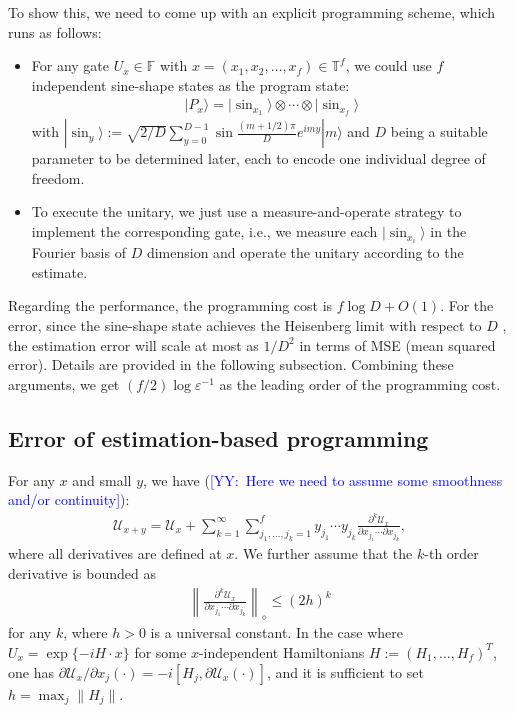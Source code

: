 \documentclass[11pt,letterpaper]{article}
\newcommand{\ket}[1]{| #1 \rangle}
\def\eps{\varepsilon}
\newcommand{\YY}[1]{\textcolor{blue}{[YY:\ #1]}}
\begin{document}
To show this, we need to come up with an explicit programming scheme, which runs as follows:
\begin{itemize}
    \item For any gate $U_x\in\mathbb{F}$ with $x=(x_1,x_2,\dots,x_f)\in\mathbb{T}^f$, we could use $f$ independent sine-shape states \cite{buvzek1999optimal} as the program state:
    \begin{align*}
        \ket{P_x}=\ket{\sin_{x_1}}\otimes\cdots\otimes\ket{\sin_{x_f}}
    \end{align*}
    with $\ket{\sin_{y}}:=\sqrt{2/D}\sum_{y=0}^{D-1} \sin\frac{(m+1/2)\pi}{D}e^{imy}\ket{m}$ and $D$ being a suitable parameter to be determined later, each to encode one individual degree of freedom. 
    \item To execute the unitary, we just use a measure-and-operate strategy to implement the corresponding gate, i.e., we measure each $\ket{\sin_{x_i}}$ in the Fourier basis of $D$ dimension and operate the unitary according to the estimate.  
\end{itemize}
Regarding the performance, the programming cost is $f\log D+O(1)$. For the error, since the sine-shape state achieves the Heisenberg limit with respect to $D$ \cite{buvzek1999optimal}, the estimation error will scale at most as $1/D^2$ in terms of MSE (mean squared error). Details are provided in the following subsection. Combining these arguments, we get $(f/2)\log\eps^{-1}$ as the leading order of the programming cost.

\subsection{Error of estimation-based programming}
For any $x$ and small $y$, we have (\YY{Here we need to assume some smoothness and/or continuity}):
\begin{align}\label{eq:taylorUx}
    \mathcal{U}_{x+y} = \mathcal{U}_{x} + \sum_{k=1}^{\infty}\sum_{j_1,\dots,j_k=1}^{f}y_{j_1}\cdots y_{j_k}\frac{\partial^k \mathcal{U}_x}{\partial x_{j_1}\cdots\partial x_{j_k}},
\end{align}
where all derivatives are defined at $x$. We further assume that the $k$-th order derivative is bounded as
\begin{align}\label{eq:derivativebound}
    \left\|\frac{\partial^k \mathcal{U}_x}{\partial x_{j_1}\cdots\partial x_{j_k}}\right\|_{\diamond}\le (2h)^k
\end{align}
for any $k$, where $h>0$ is a universal constant. In the case where $U_x=\exp\{-iH\cdot x\}$ for some $x$-independent Hamiltonians $H:=(H_1,\dots,H_f)^T$, one has $\partial \mathcal{U}_x/\partial{x_j}(\cdot)=-i[H_j,\partial \mathcal{U}_x(\cdot)]$, and it is sufficient to set $h=\max_j\|H_j\|$.
\end{document}
